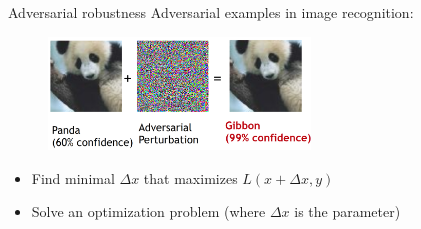 \documentclass[usenames,dvipsnames,notes,11pt,aspectratio=169,hyperref={colorlinks=true, linkcolor=blue}]{beamer}
\newcommand{\pdfnote}[1]{}
\begin{document}
\begin{frame}
    {Adversarial robustness}
    Adversarial examples in image recognition:
    \begin{figure}
        \includegraphics[height=3cm]{figures/advex}
    \end{figure}
    \begin{itemize}
        \item Find minimal $\Delta x$ that maximizes $L(x+\Delta x, y)$ 
        \item Solve an optimization problem (where $\Delta x$ is the parameter)
    \end{itemize}
    \pdfnote{discrete space, change the label. therefore need heuristics and human efforts}
\end{frame}
\end{document}
